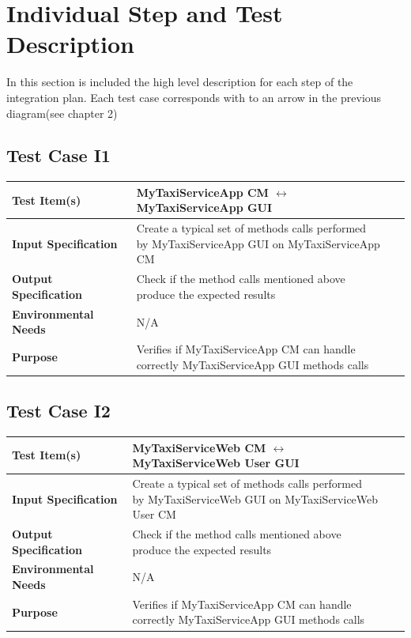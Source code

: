 \documentclass[11pt,titlepage]{article} %
\begin{document}
\newpage
\section{Individual Step and Test Description}
  In this section is included the high level description for each step of the integration plan.
  Each test case corresponds with to an arrow in the previous diagram(see chapter 2)
  \subsection{Test Case I1}
  \begin{table}[ht!]
    \begin{tabular*}{16cm}{ll}
	\hline
	\textbf{Test Item(s)} & MyTaxiServiceApp CM $ \longleftrightarrow $ MyTaxiServiceApp GUI \\
	\hline
	\textbf{Input Specification} & \pbox{20cm}{Create a typical set of methods calls performed \\ by MyTaxiServiceApp GUI on MyTaxiServiceApp CM}\\
	\hline
	\textbf{Output Specification} & \pbox{20cm}{Check if the method calls mentioned above \\ produce the expected results}\\
	\hline
	\textbf{Environmental Needs} & N/A\\
	\hline
	\textbf{Purpose} & \pbox{20cm}{Verifies if MyTaxiServiceApp CM can handle \\ correctly MyTaxiServiceApp GUI methods calls} \\
	\hline
    \end{tabular*}
  \end{table}
  
  \subsection{Test Case I2}
  \begin{table}[ht!]
    \begin{tabular*}{16cm}{ll}
	\hline
	\textbf{Test Item(s)} & MyTaxiServiceWeb CM $ \longleftrightarrow $ MyTaxiServiceWeb User GUI \\
	\hline
	\textbf{Input Specification} & \pbox{20cm}{Create a typical set of methods calls performed \\ by MyTaxiServiceWeb GUI on MyTaxiServiceWeb User CM} \\
	\hline
	\textbf{Output Specification} & \pbox{20cm}{Check if the method calls mentioned above \\ produce the expected results} \\
	\hline
	\textbf{Environmental Needs} & N/A\\
	\hline
	\textbf{Purpose} & \pbox{20cm}{ Verifies if MyTaxiServiceApp CM can handle \\ correctly MyTaxiServiceApp GUI methods calls} \\
	\hline
    \end{tabular*}
  \end{table}
  
\end{document}
